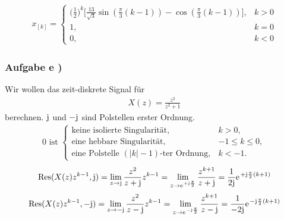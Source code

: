 \documentclass[11pt,a4paper,DIV=12]{scrartcl}
\begin{document}
\begin{align}
	x_[k]=\begin{cases}
		\bigg(\frac{1}{2}\bigg)^{k}\Bigg[\frac{13}{\sqrt{3}}\sin(\frac{\pi}{3}(k-1))-\cos(\frac{\pi}{3}(k-1))\Bigg], &k>0 \\
		1, &k=0 \\
		0, &k<0
	\end{cases}
\end{align}
\subsubsection{Aufgabe e )}
Wir wollen das zeit-diskrete Signal für
\begin{align}
	X(z)=\frac{z^2}{z^2+1}
\end{align}
berechnen.
$\im$ und $-\im$ sind Polstellen erster Ordnung.
\begin{align}
	0 \text{ ist }\begin{cases}
		\text{keine isolierte Singularität}, &k> 0,\\
		\text{eine hebbare Singularität}, &-1\leq k \leq 0,\\
		\text{eine Polstelle } (|k|-1)\text{-ter Ordnung}, &k<-1.
	\end{cases}
\end{align}
\begin{align}
	\mathrm{Res}(X(z)z^{k-1},\im)=\lim\limits_{z\rightarrow\im}\frac{z^2}{z+\im}z^{k-1}=\lim\limits_{z\rightarrow\e^{+\im\frac{\pi}{2}}}\frac{z^{k+1}}{z+\im}=\frac{1}{2\im}\e^{+\im\frac{\pi}{2}(k+1)}
\end{align}
\begin{align}
	\mathrm{Res}(X(z)z^{k-1},-\im)=\lim\limits_{z\rightarrow-\im}\frac{z^2}{z-\im}z^{k-1}=\lim\limits_{z\rightarrow\e^{-\im\frac{\pi}{2}}}\frac{z^{k+1}}{z-\im}=\frac{1}{-2\im}\e^{-\im\frac{\pi}{2}(k+1)}
\end{align}
\end{document}
